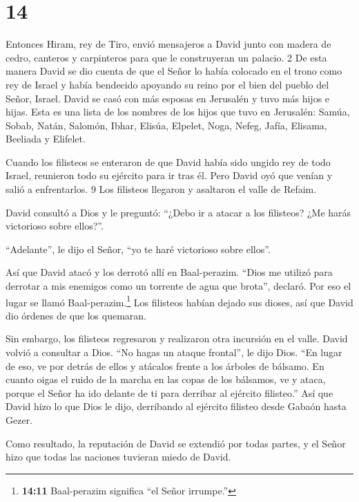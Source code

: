 \hypertarget{section-13}{%
\section{14}\label{section-13}}

 Entonces Hiram, rey de Tiro, envió mensajeros a David junto
con madera de cedro, canteros y carpinteros para que le construyeran un
palacio. 2 De esta manera David se dio cuenta de que el Señor lo había
colocado en el trono como rey de Israel y había bendecido apoyando su
reino por el bien del pueblo del Señor, Israel.  David se
casó con más esposas en Jerusalén y tuvo más hijos e hijas. 
Esta es una lista de los nombres de los hijos que tuvo en Jerusalén:
Samúa, Sobab, Natán, Salomón,  Ibhar, Elisúa, Elpelet,
 Noga, Nefeg, Jafía,  Elisama, Beeliada y
Elifelet.

 Cuando los filisteos se enteraron de que David había sido
ungido rey de todo Israel, reunieron todo su ejército para ir tras él.
Pero David oyó que venían y salió a enfrentarlos. 9 Los filisteos
llegaron y asaltaron el valle de Refaim.

 David consultó a Dios y le preguntó: ``¿Debo ir a atacar a
los filisteos? ¿Me harás victorioso sobre ellos?''.

``Adelante'', le dijo el Señor, ``yo te haré victorioso sobre ellos''.

 Así que David atacó y los derrotó allí en Baal-perazim.
``Dios me utilizó para derrotar a mis enemigos como un torrente de agua
que brota'', declaró. Por eso el lugar se llamó Baal-perazim.\footnote{\textbf{14:11}
  Baal-perazim significa ``el Señor irrumpe.''}  Los
filisteos habían dejado sus dioses, así que David dio órdenes de que los
quemaran.

 Sin embargo, los filisteos regresaron y realizaron otra
incursión en el valle.  David volvió a consultar a Dios.
``No hagas un ataque frontal'', le dijo Dios. ``En lugar de eso, ve por
detrás de ellos y atácalos frente a los árboles de bálsamo.
 En cuanto oigas el ruido de la marcha en las copas de los
bálsamos, ve y ataca, porque el Señor ha ido delante de ti para derribar
al ejército filisteo.''  Así que David hizo lo que Dios le
dijo, derribando al ejército filisteo desde Gabaón hasta Gezer.

 Como resultado, la reputación de David se extendió por
todas partes, y el Señor hizo que todas las naciones tuvieran miedo de
David.

